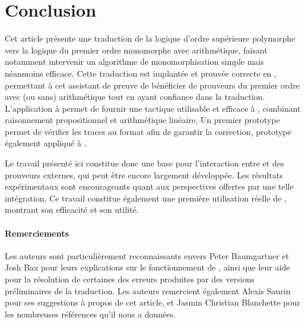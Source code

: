 \section{Conclusion}

Cet article présente une traduction de la logique d'ordre supérieure
polymorphe vers la logique du premier ordre monomorphe avec
arithmétique, faisant notamment intervenir un algorithme de
monomorphisation simple mais néanmoins efficace. Cette traduction est
implantée et prouvée correcte en \holfour, permettant à cet assistant de
preuve de bénéficier de prouveurs du premier ordre avec (ou sans)
arithmétique tout en ayant confiance dans la traduction. L'application à
\beagle permet de fournir une tactique utilisable et efficace à
\holfour, combinant raisonnement propositionnel et arithmétique
linéaire. Un premier prototype permet de vérifier les traces au format
\tff afin de garantir la correction, prototype également appliqué à
\beagle.

Le travail présenté ici constitue donc une base pour l'interaction entre
\holfour et des prouveurs externes, qui peut être encore largement
développée. Les résultats expérimentaux sont encourageants quant aux
perspectives offertes par une telle intégration. Ce travail constitue
également une première utilisation réelle de \beagle, montrant son
efficacité et son utilité.


\paragraph{Remerciements}

Les auteurs sont particulièrement reconnaissants envers Peter
Baumgartner et Josh Bax pour leurs explications sur le fonctionnement de
\beagle, ainsi que leur aide pour la résolution de certaines des erreurs
produites par des versions préliminaires de la traduction. Les auteurs
remercient également Alexis Saurin pour ses suggestions à propos de
cet article, et Jasmin Christian Blanchette pour les nombreuses
références qu'il nous a données.

